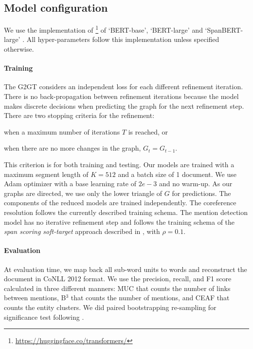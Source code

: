 \documentclass[11pt]{article}
\begin{document}
\subsection{Model configuration}
We use the implementation of \citet{wolf2019huggingface}\footnote{\url{https://huggingface.co/transformers/}} of `BERT-base', `BERT-large' \cite{joshi-etal-2019-bert} and `SpanBERT-large' \cite{joshi-etal-2020-spanbert}. All hyper-parameters follow this implementation unless specified otherwise.  

\paragraph{Training}  The G2GT considers an independent loss for each different refinement iteration. There is no back-propagation between refinement iterations because the model makes discrete decisions when predicting the graph for the next refinement step. There are two stopping criteria for the refinement: 
	\begin{enumerate*}[(\alph*)]
		\item when a maximum number of iterations $T$ is reached, or
		\item when there are no more changes in the graph, $G_t = G_{t-1}$. 
	\end{enumerate*}
This criterion  is for both training and testing. 
Our models are trained with a maximum segment length of $K=512$ and a batch size of 1 document. We use Adam \cite{kingma2014adam, wolf2019huggingface} optimizer with a base learning rate of $2e{-}3$ and no warm-up. As our graphs are directed, we use only the lower triangle of $G$ for predictions. The components of the reduced models are trained independently. The coreference resolution follows the currently described training schema. The mention detection model has no iterative refinement step and follows the training schema of the \emph{span scoring soft-target} approach described in \cite{miculicich-henderson-2020-partially}, with $\rho=0.1$. 
	
\paragraph{Evaluation}  At evaluation time, we map back all sub-word units to words and reconstruct the document in CoNLL 2012 format. We use the precision, recall, and F1 score calculated in three different manners: MUC that counts the number of links between mentions, B$^3$ that counts the number of mentions, and CEAF that counts the entity clusters. We did paired bootstrapping re-sampling for significance test following \cite{koehn-2004-statistical}.
\end{document}
